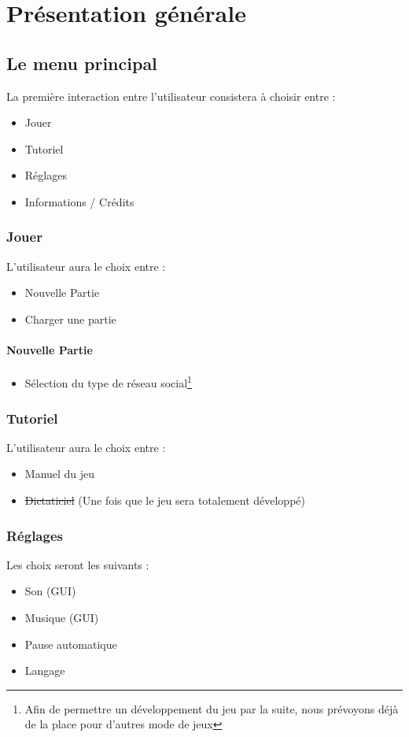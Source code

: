 \chapter{Présentation générale}
\label{chap:presentationgenerale}

\section{Le menu principal}

La première interaction entre l'utilisateur consistera à choisir entre :

\begin{itemize}
    \item Jouer
    \item Tutoriel
    \item Réglages
    \item Informations / Crédits
\end{itemize}

\subsection{Jouer}
L'utilisateur aura le choix entre :
\begin{itemize}
    \item Nouvelle Partie
    \item Charger une partie
\end{itemize}
\subsubsection{Nouvelle Partie}
\begin{itemize}
    \item Sélection du type de réseau social\footnote{Afin de permettre un développement du jeu par la suite, nous prévoyons déjà de la place pour d'autres mode de jeux}
\end{itemize}

\subsection{Tutoriel}
L'utilisateur aura le choix entre :
\begin{itemize}
    \item Manuel du jeu
    \item \sout{Dictaticiel} (Une fois que le jeu sera totalement développé)
\end{itemize}
\clearpage
\subsection{Réglages}
Les choix seront les suivants :
\begin{itemize}
    \item Son (GUI)
    \item Musique (GUI)
    \item Pause automatique
    \item Langage
\end{itemize}

